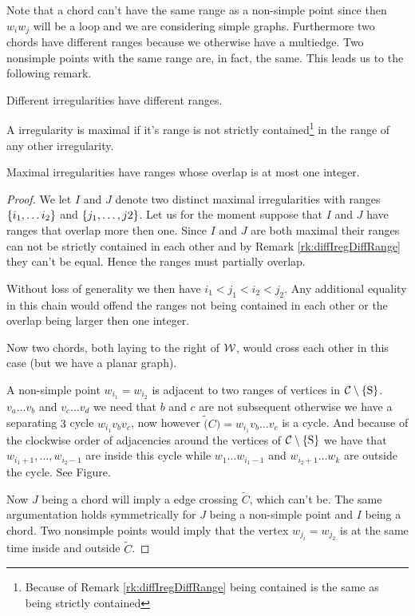 Note that a chord can't have the same range as a non-simple point since then $w_i w_j$ will be a loop and we are considering simple graphs. Furthermore two chords have different ranges because we otherwise have a multiedge. Two nonsimple points with the same range are, in fact, the same. This leads us to the following remark.
\begin{remark}
\label{rk:diffIregDiffRange}
Different irregularities have different ranges.
\end{remark}

\begin{defi}
A irregularity is maximal if it's range is not strictly contained\footnote{Because of Remark \ref{rk:diffIregDiffRange} being contained is the same as being strictly contained} in the range of any other irregularity.
\end{defi}

\begin{lemma}
\label{lm:rangeOverlap}
Maximal irregularities have ranges whose overlap is at most one integer.
\end{lemma}
\begin{proof}
We let $I$ and $J$ denote two distinct maximal irregularities with ranges $\left\lbrace {i_1, \ldots i_2} \right\rbrace$ and $\left\lbrace {j_1, \ldots, j2} \right\rbrace$. Let us for the moment suppose that $I$ and $J$ have ranges that overlap more then one. Since $I$ and $J$ are both maximal their ranges can not be strictly contained in each other and by Remark \ref{rk:diffIregDiffRange} they can't be equal. Hence the ranges must partially overlap.

Without loss of generality we then have $i_1 < j_1 < i_2 < j_2$. Any additional equality in this chain would offend the ranges not being contained in each other or the overlap being larger then one integer.

Now two chords, both laying to the right of $\mathcal{W}$, would cross each other in this case (but we have a planar graph).

A non-simple point $w_{i_1} = w_{i_2}$ is adjacent to two ranges of vertices in $\mathcal{C} \setminus \left\lbrace {\mathrm{S}} \right\rbrace$. $v_a \ldots v_b$ and $v_c \ldots v_d$ we need that $b$ and $c$ are not subsequent otherwise we have a separating $3$ cycle $w_{i_1} v_b v_c$, now however $\tilde(C) = w_{i_1} v_b \ldots v_c$ is a cycle. And because of the clockwise order of adjacencies around the vertices of $\mathcal{C} \setminus \left\lbrace {\mathrm{S}} \right\rbrace$ we have that $w_{i_1 +1}, \ldots, w_{i_2 -1}$ are inside this cycle while $ w_1 \ldots w_{i_1 -1}$ and $ w_{i_2 +1} \ldots w_k$ are outside the cycle. See Figure.  

Now $J$ being a chord will imply a edge crossing $\tilde{C}$, which can't be. The same argumentation holds symmetrically for $J$ being a non-simple point and $I$ being a chord. Two nonsimple points would imply that the vertex $w_{j_i} = w_{j_2}$ is at the same time inside and outside $\tilde{C}$.
\end{proof}

